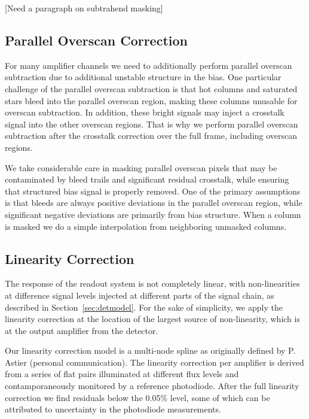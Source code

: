 \documentclass[SE,authoryear,lsstdraft,toc]{lsstdoc}
\begin{document}
[Need a paragraph on subtrahend masking]

\subsection{Parallel Overscan Correction}
\label{sec:paralleloverscancorr}

For many amplifier channels we need to additionally perform parallel overscan subtraction due to additional unstable structure in the bias.
One particular challenge of the parallel overscan subtraction is that hot columns and saturated stars bleed into the parallel overscan region, making these columns unusable for overscan subtraction.
In addition, these bright signals may inject a crosstalk signal into the other overscan regions.
That is why we perform parallel overscan subtraction after the crosstalk correction over the full frame, including overscan regions.

We take considerable care in masking parallel overscan pixels that may be contaminated by bleed trails and significant residual crosstalk, while ensuring that structured bias signal is properly removed.
One of the primary assumptions is that bleeds are always positive deviations in the parallel overscan region, while significant negative deviations are primarily from bias structure.
When a column is masked we do a simple interpolation from neighboring unmasked columns.

\subsection{Linearity Correction}
\label{sec:linearitycorr}

The response of the readout system is not completely linear, with non-linearities at difference signal levels injected at different parts of the signal chain, as described in Section~\ref{sec:detmodel}.
For the sake of simplicity, we apply the linearity correction at the location of the largest source of non-linearity, which is at the output amplifier from the detector.

Our linearity correction model is a multi-node spline as originally defined by P. Astier (personal communication).
The linearity correction per amplifier is derived from a series of flat pairs illuminated at different flux levels and contamporaneously monitored by a reference photodiode.
After the full linearity correction we find residuals below the 0.05\% level, some of which can be attributed to uncertainty in the photodiode measurements.
\end{document}
